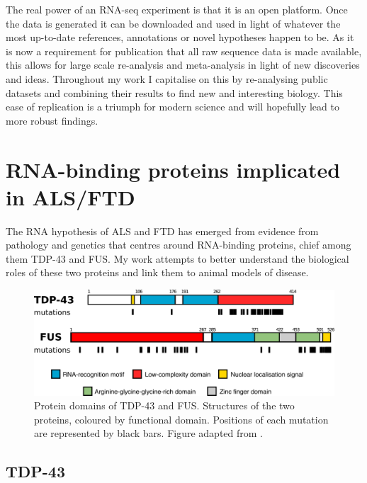 The real power of an RNA-seq experiment is that it is an open platform. 
Once the data is generated it can be downloaded and used in light of whatever the most up-to-date references, annotations or novel hypotheses happen to be. 
As it is now a requirement for publication that all raw sequence data is made available, this allows for large scale re-analysis and meta-analysis in light of new discoveries and ideas. 
Throughout my work I capitalise on this by re-analysing public datasets and combining their results to find new and interesting biology.
This ease of replication is a triumph for modern science and will hopefully lead to more robust findings.


\section{RNA-binding proteins implicated in ALS/FTD}

The RNA hypothesis of ALS and FTD has emerged from evidence from pathology and genetics that centres around RNA-binding proteins, chief among them TDP-43 and FUS.
My work attempts to better understand the biological roles of these two proteins and link them to animal models of disease.

\begin{figure}[h!]
	\centering
	\includegraphics[width=\textwidth]{Figures/01_introduction/tdp_fus_structures.png}
	\caption{
		Protein domains of TDP-43 and FUS. Structures of the two proteins, coloured by functional domain. Positions of each mutation are represented by black bars. Figure adapted from \citep{Kapeli2017}. 
	}
	\label{fig:intro_domains}
\end{figure}


\subsection{TDP-43}

